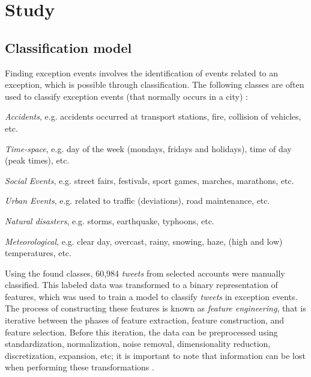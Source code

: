 \documentclass[runningheads]{llncs}
\begin{document}
\section{Study}
\subsection{Classification model}
\label{featuresEng}

Finding exception events involves the identification of events related to an exception, which is possible through classification. The following classes are often used to classify exception events (that normally occurs in a city) \cite{Itoh2016, Chen2016, Lecue2014, Gal-Tzur2014}:

\begin{enumerate*}
\item \textit{Accidents}, e.g. accidents occurred at transport stations, fire, collision of vehicles, etc.

\item \textit{Time-space}, e.g. day of the week (mondays, fridays and holidays), time of day (peak times), etc.

\item \textit{Social Events}, e.g. street fairs, festivals, sport games, marches, marathons, etc.

\item \textit{Urban Events}, e.g. related to traffic (deviations), road maintenance, etc.

\item \textit{Natural disasters}, e.g. storms, earthquake, typhoons, etc.

\item \textit{Meteorological}, e.g. clear day, overcast, rainy, snowing, haze, (high and low) temperatures, etc.
\end{enumerate*}

Using the found classes, 60,984 \textit{tweets} from selected accounts were manually classified. This labeled data was transformed to a binary representation of features, which was used to train a model to classify \textit{tweets} in exception events. The process of constructing these features is known as \textit{feature engineering}, that is iterative between the phases of feature extraction, feature construction, and feature selection. Before this iteration, the data can be preprocessed using standardization, normalization, noise removal, dimensionality reduction, discretization, expansion, etc; it is important to note that information can be lost when performing these transformations \cite{guyon2006introduction}.
\end{document}
